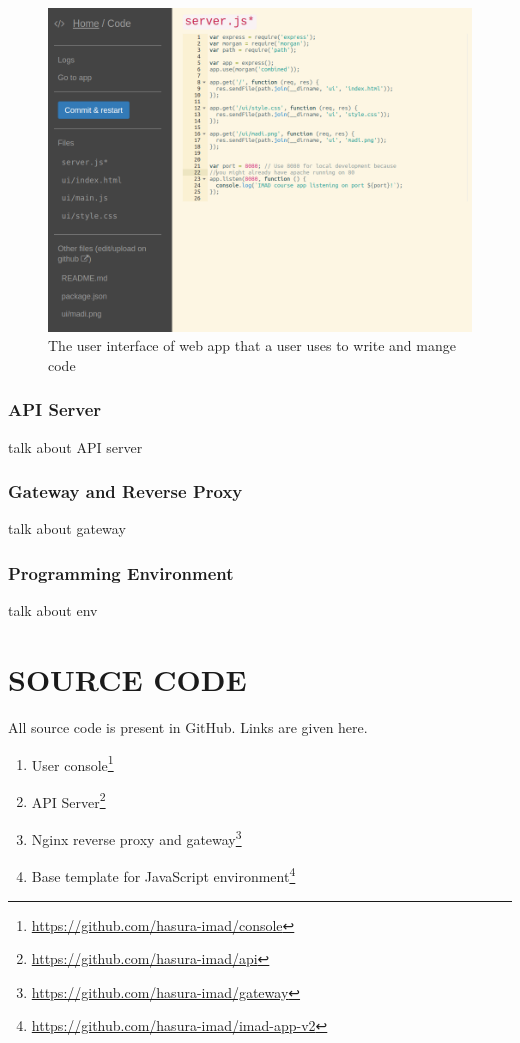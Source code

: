 \documentclass[DD]{iitmdiss}
\begin{document}
\begin{figure}
\centering
\includegraphics[width=0.9\linewidth]{img/code_interface}
\caption[User interface to code]{The user interface of web app that a user uses to write and mange code}
\label{fig:codeinterface}
\end{figure}

\subsection{API Server}
talk about API server
\subsection{Gateway and Reverse Proxy}
talk about gateway
\subsection{Programming Environment}
talk about env


\appendix

\chapter{SOURCE CODE}

All source code is present in GitHub. Links are given here.
\begin{enumerate}
	\item User console\footnote{\url{https://github.com/hasura-imad/console}}
	\item API Server\footnote{\url{https://github.com/hasura-imad/api}}
	\item Nginx reverse proxy and gateway\footnote{\url{https://github.com/hasura-imad/gateway}}
	\item Base template for JavaScript environment\footnote{\url{https://github.com/hasura-imad/imad-app-v2}}
\end{enumerate}
\end{document}
